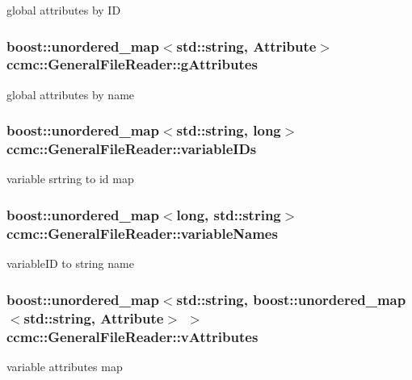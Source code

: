 global attributes by I\-D \hypertarget{classccmc_1_1_general_file_reader_ae5d6c9e0cebe12ce9564b99f1175f319}{
\subsubsection[{g\-Attributes}]{\setlength{\rightskip}{0pt plus 5cm}boost\-::unordered\-\_\-map$<$std\-::string, {\bf Attribute}$>$ ccmc\-::\-General\-File\-Reader\-::g\-Attributes\hspace{0.3cm}{\ttfamily [protected]}}}\label{classccmc_1_1_general_file_reader_ae5d6c9e0cebe12ce9564b99f1175f319}
global attributes by name \hypertarget{classccmc_1_1_general_file_reader_a70d799a29940fa982885ce8c0963942d}{
\subsubsection[{variable\-I\-Ds}]{\setlength{\rightskip}{0pt plus 5cm}boost\-::unordered\-\_\-map$<$std\-::string, long$>$ ccmc\-::\-General\-File\-Reader\-::variable\-I\-Ds\hspace{0.3cm}{\ttfamily [protected]}}}\label{classccmc_1_1_general_file_reader_a70d799a29940fa982885ce8c0963942d}
variable srtring to id map \hypertarget{classccmc_1_1_general_file_reader_aa3a4c9091feaec12035bcc981299de47}{
\subsubsection[{variable\-Names}]{\setlength{\rightskip}{0pt plus 5cm}boost\-::unordered\-\_\-map$<$long, std\-::string$>$ ccmc\-::\-General\-File\-Reader\-::variable\-Names\hspace{0.3cm}{\ttfamily [protected]}}}\label{classccmc_1_1_general_file_reader_aa3a4c9091feaec12035bcc981299de47}
variable\-I\-D to string name \hypertarget{classccmc_1_1_general_file_reader_a806b25ba22db767f9f61ae578634ef08}{
\subsubsection[{v\-Attributes}]{\setlength{\rightskip}{0pt plus 5cm}boost\-::unordered\-\_\-map$<$std\-::string, boost\-::unordered\-\_\-map$<$std\-::string, {\bf Attribute}$>$ $>$ ccmc\-::\-General\-File\-Reader\-::v\-Attributes\hspace{0.3cm}{\ttfamily [protected]}}}\label{classccmc_1_1_general_file_reader_a806b25ba22db767f9f61ae578634ef08}
variable attributes map 

